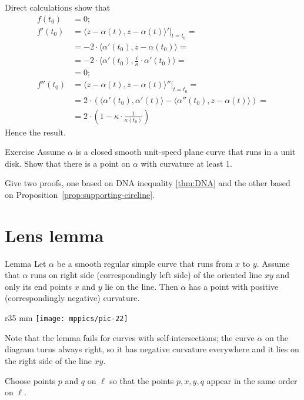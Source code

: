 Direct calculations show that
\begin{align*}
f(t_0)&=0;
\\
f'(t_0)&=\left.\langle z-\alpha(t),z-\alpha(t) \rangle'\right|_{t=t_0}=
\\
&=-2\cdot \langle \alpha'(t_0),z-\alpha(t_0) \rangle=
\\&=-2\cdot \langle \alpha'(t_0),\tfrac i\kappa \cdot\alpha'(t_0) \rangle=
\\
&=0;
\\
f''(t_0)&=\langle z-\alpha(t),z-\alpha(t) \rangle''|_{t=t_0}=
\\
&=2\cdot\left( \langle \alpha'(t_0),\alpha'(t) \rangle-\langle \alpha''(t_0),z-\alpha(t) \rangle \right)=
\\
&=2\cdot\left(1-\kappa\cdot \frac1{\kappa(t_0)}\right)
\end{align*}
Hence the result.\qeds


\begin{thm}{Exercise}
Assume $\alpha$ is a closed smooth unit-speed plane curve that runs in a unit disk.
Show that there is a point on $\alpha$ with curvature at least $1$.

Give two proofs, one based on DNA inequality \ref{thm:DNA} and the other based on Proposition~\ref{prop:supporting-circline}.
\end{thm}

\section{Lens lemma}

\begin{thm}{Lemma}\label{lem:lens}
Let $\alpha$ be a smooth regular simple curve that runs from $x$ to $y$.
Assume that $\alpha$ runs on right side (correspondingly left side) of the oriented line $xy$ and only its end points $x$ and $y$ lie on the line.
Then $\alpha$ has a point with positive  (correspondingly negative) curvature.
\end{thm}

\begin{wrapfigure}{r}{35 mm}
\vskip-4mm
\centering
\texttt{[image: mppics/pic-22]}
\vskip0mm
\end{wrapfigure}

Note that the lemma fails for curves with self-intersections;
the curve $\alpha$ on the diagram turns always right, 
so it has negative curvature everywhere and it lies on the right side of the line $xy$. 

Choose points $p$ and $q$ on $\ell$
so that the points $p, x, y, q$ appear in the same order on $\ell$.

